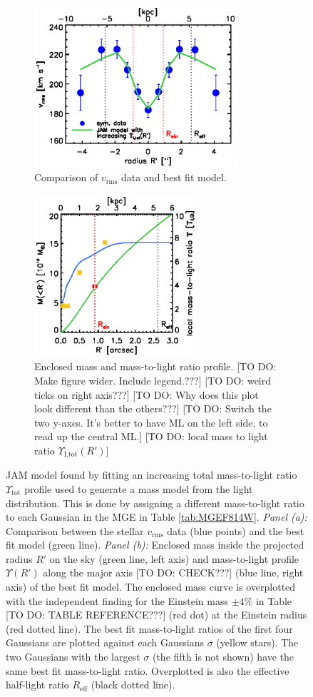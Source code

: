 
\begin{figure}
\centering
\begin{subfigure}{.5\textwidth}
  \centering
  \includegraphics[height=6cm]{fig/jam_G_vrms.ps}
  \caption{Comparison of $v_\text{rms}$ data and best fit model.}
  \label{fig:JAM_modelG}
\end{subfigure}%
\begin{subfigure}{.5\textwidth}
  \centering
  \includegraphics[height=6cm]{fig/jam_G_enclMass.ps}
  \caption{Enclosed mass and mass-to-light ratio profile. [TO DO: Make figure wider. Include legend.???] [TO DO: weird  ticks on right axis???] [TO DO: Why does this plot look different than the others???] [TO DO: Switch the two y-axes. It's better to have ML on the left side, to read up the central ML.] [TO DO: local mass to light ratio $\Upsilon_\text{I,tot}(R')$]}
  \label{fig:enclMass_modelG}
\end{subfigure}
\caption{JAM model found by fitting an increasing total mass-to-light ratio $\Upsilon_\text{tot}$ profile used to generate a mass model from the light distribution.  This is done by assigning a different mass-to-light ratio to each Gaussian in the MGE in Table \ref{tab:MGEF814W}. \emph{Panel (a):} Comparison between the stellar $v_\text{rms}$ data (blue points) and the best fit model (green line). \emph{Panel (b):} Enclosed mass inside the projected radius $R'$ on the sky (green line, left axis) and mass-to-light profile $\Upsilon(R')$ along the major axis [TO DO: CHECK???] (blue line, right axis) of the best fit model. The enclosed mass curve is overplotted with the independent finding for the Einstein mass $\pm 4 \%$ in Table [TO DO: TABLE REFERENCE???] (red dot) at the Einstein radius (red dotted line). The best fit mass-to-light ratios of the first four Gaussians are plotted against each Gaussians $\sigma$ (yellow stars). The two Gaussians with the largest $\sigma$ (the fifth is not shown) have the same best fit mass-to-light ratio. Overplotted is also the effective half-light ratio $R_\text{eff}$ (black dotted line).}

\end{figure}
